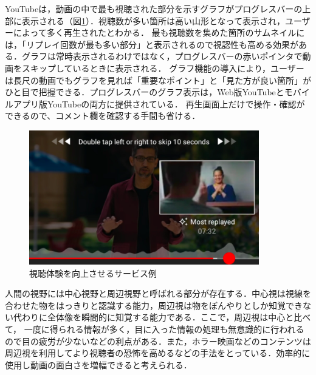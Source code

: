 YouTubeは，動画の中で最も視聴された部分を示すグラフがプログレスバーの上部に表示される（図\ref{youtube}）．視聴数が多い箇所は高い山形となって表示され，ユーザーによって多く再生されたとわかる．
最も視聴数を集めた箇所のサムネイルには，「リプレイ回数が最も多い部分」と表示されるので視認性も高める効果がある．グラフは常時表示されるわけではなく，プログレスバーの赤いポインタで動画をスキップしているときに表示される．
グラフ機能の導入により，ユーザーは長尺の動画でもグラフを見れば「重要なポイント」と「見た方が良い箇所」がひと目で把握できる．プログレスバーのグラフ表示は，Web版YouTubeとモバイルアプリ版YouTubeの両方に提供されている．
再生画面上だけで操作・確認ができるので、コメント欄を確認する手間も省ける．

\begin{figure}[H]
    \centering
    \includegraphics[width=10cm]{images/chapter1/YouTube.png}
    \caption{視聴体験を向上させるサービス例\cite{tube}}
    \label{youtube}
\end{figure}

人間の視野には中心視野と周辺視野と呼ばれる部分が存在する．中心視は視線を合わせた物をはっきりと認識する能力，周辺視は物をぼんやりとしか知覚できない代わりに全体像を瞬間的に知覚する能力である．ここで，周辺視は中心と比べて，
一度に得られる情報が多く，目に入った情報の処理も無意識的に行われるので目の疲労が少ないなどの利点がある．また，ホラー映画などのコンテンツは周辺視を利用してより視聴者の恐怖を高めるなどの手法をとっている．効率的に使用し動画の面白さを増幅できると考えられる．

